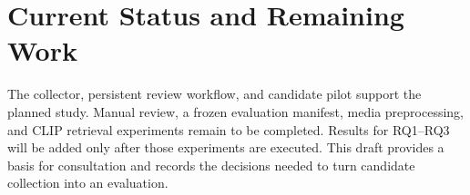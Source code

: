 \documentclass[journal,a4paper,onecolumn]{IEEEtran}
\begin{document}
\section{Current Status and Remaining Work}
The collector, persistent review workflow, and candidate pilot support the planned study. Manual review, a frozen evaluation manifest, media preprocessing, and CLIP retrieval experiments remain to be completed. Results for RQ1--RQ3 will be added only after those experiments are executed. This draft provides a basis for consultation and records the decisions needed to turn candidate collection into an evaluation.


\end{document}
